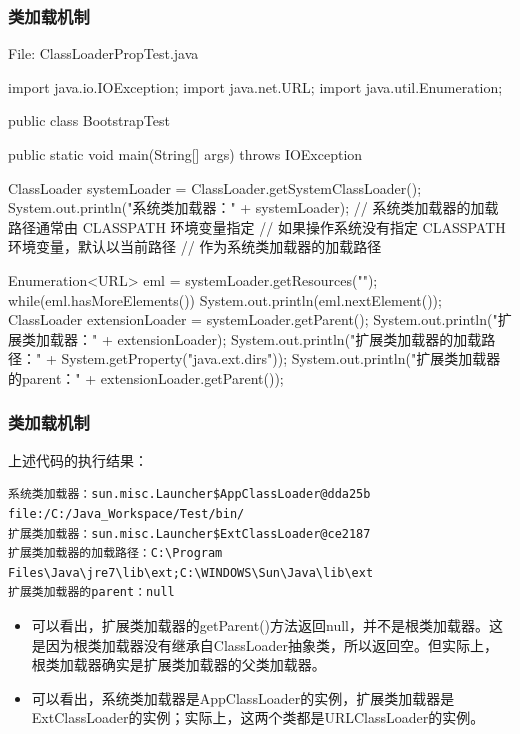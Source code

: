 \documentclass[hyperref={pdfpagelabels=false},compress,table]{beamer} %
\newcommand{\kai}{\CJKfamily{KaiTi}}
\def\Red{\color{red}}
\begin{document}
\begin{frame}[fragile] %
\frametitle{类加载机制}

File: ClassLoaderPropTest.java

\begin{javaCode}
import java.io.IOException;
import java.net.URL;
import java.util.Enumeration;

public class BootstrapTest {
  public static void main(String[] args) throws IOException {
    ClassLoader systemLoader = ClassLoader.getSystemClassLoader();
    System.out.println("系统类加载器：" + systemLoader);
    // 系统类加载器的加载路径通常由 CLASSPATH 环境变量指定
    // 如果操作系统没有指定 CLASSPATH 环境变量，默认以当前路径
    // 作为系统类加载器的加载路径  

    Enumeration<URL> eml = systemLoader.getResources(""); 
    while(eml.hasMoreElements()) {
      System.out.println(eml.nextElement());
    }
    ClassLoader extensionLoader = systemLoader.getParent();
    System.out.println("扩展类加载器：" + extensionLoader);
    System.out.println("扩展类加载器的加载路径：" + System.getProperty("java.ext.dirs"));
    System.out.println("扩展类加载器的parent：" + extensionLoader.getParent());
  }
}
\end{javaCode}
\end{frame}

\begin{frame}[fragile] %
\frametitle{类加载机制}
上述代码的执行结果：
{\footnotesize
\begin{verbatim}
系统类加载器：sun.misc.Launcher$AppClassLoader@dda25b
file:/C:/Java_Workspace/Test/bin/
扩展类加载器：sun.misc.Launcher$ExtClassLoader@ce2187
扩展类加载器的加载路径：C:\Program Files\Java\jre7\lib\ext;C:\WINDOWS\Sun\Java\lib\ext
扩展类加载器的parent：null
\end{verbatim}}
\begin{itemize}
\item {\Red\kai 可以看出，扩展类加载器的getParent()方法返回null，并不是根类加载器。这是因为根类加载器没有继承自ClassLoader抽象类，所以返回空。但实际上，根类加载器确实是扩展类加载器的父类加载器。}
\item 可以看出，系统类加载器是AppClassLoader的实例，扩展类加载器是ExtClassLoader的实例；实际上，这两个类都是URLClassLoader的实例。
\end{itemize}
\end{frame}
\end{document}
